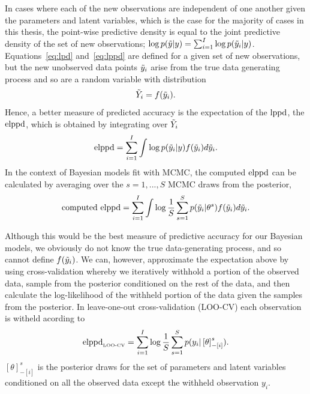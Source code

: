In cases where each of the new observations are independent of one another given the parameters and latent variables, which is the case for the majority of cases in this thesis, the point-wise predictive density is equal to the joint predictive density of the set of new observations; $\log p(\Tilde{y}|y) = {\sum}^I_{i = 1} \log p(\Tilde{y}_i|y)$. Equations~\eqref{eq:lpd} and~\eqref{eq:lppd} are defined for a given set of new observations, but the new unobserved data points $\Tilde{y}_i$ arise from the true data generating process and so are a random variable with distribution
\begin{equation} \label{ep:y_tild_dist}
 \Tilde{Y}_i = f(\Tilde{y}_i).
\end{equation}
Hence, a better measure of predicted accuracy is the expectation of the $\hbox{lppd}$, the $\hbox{elppd}$, which is obtained by integrating over $\Tilde{Y}_i$
\begin{equation} \label{ep:elppd}
 \hbox{elppd} = \sum^I_{i = 1} \int \log p(\Tilde{y}_i|y)f(\Tilde{y}_i) d\Tilde{y}_i.
\end{equation}
In the context of Bayesian models fit with MCMC, the computed $\hbox{elppd}$ can be calculated by averaging over the $s = 1, ..., S$ MCMC draws from the posterior,
\begin{equation} \label{ep:computed_elppd}
 \hbox{computed elppd} = \sum^I_{i = 1} \int \log \frac{1}{S} \sum^S_{s = 1} p(\Tilde{y}_i|\theta^s)f(\Tilde{y}_i) d\Tilde{y}_i.
\end{equation}

Although this would be the best measure of predictive accuracy for our Bayesian models, we obviously do not know the true data-generating process, and so cannot define $f(\Tilde{y}_i)$. We can, however, approximate the expectation above by using cross-validation whereby we iteratively withhold a portion of the observed data, sample from the posterior conditioned on the rest of the data, and then calculate the log-likelihood of the withheld portion of the data given the samples from the posterior. In leave-one-out cross-validation (LOO-CV) each observation is witheld acording to
\begin{equation} \label{eq:elppd_loo}
 \hbox{elppd}_{\text{\tiny{LOO-CV}}} = \sum^I_{i = 1} \log \frac{1}{S} \sum^S_{s = 1} p(y_i|\left[\theta\right]_{-\left[i\right]}^s).
\end{equation}
$\left[\theta\right]_{-\left[i\right]}^s$ is the posterior draws for the set of parameters and latent variables conditioned on all the observed data except the withheld observation $y_i$.

